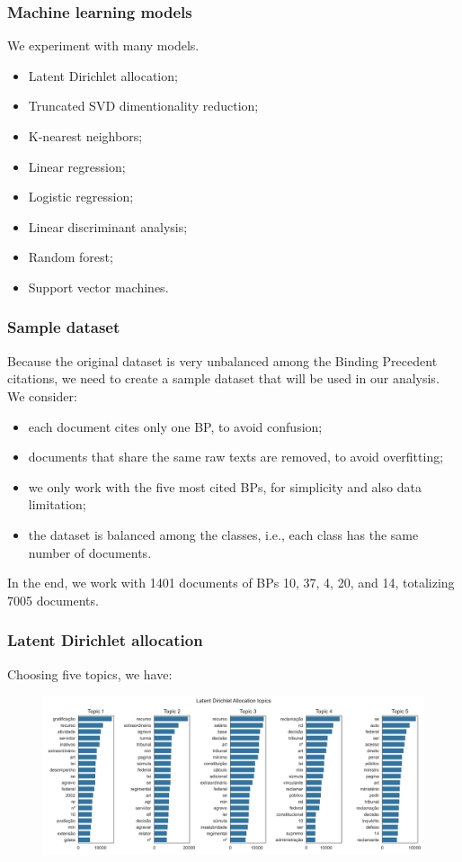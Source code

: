 \documentclass{beamer}
\begin{document}
    \begin{frame}
        \frametitle{Machine learning models}
        We experiment with many models.
        \begin{itemize}
            \item Latent Dirichlet allocation;
            \item Truncated SVD dimentionality reduction;
            \item K-nearest neighbors;
            \item Linear regression;
            \item Logistic regression;
            \item Linear discriminant analysis;
            \item Random forest;
            \item Support vector machines.
        \end{itemize}
    \end{frame}

    \begin{frame}
        \frametitle{Sample dataset}
        Because the original dataset is very unbalanced among the Binding Precedent citations, we need to create a sample dataset that will be used in our analysis. We consider:
        \begin{itemize}
            \item each document cites only one BP, to avoid confusion;
            \item documents that share the same raw texts are removed, to avoid overfitting;
            \item we only work with the five most cited BPs, for simplicity and also data limitation;
            \item the dataset is balanced among the classes, i.e., each class has the same number of documents.
        \end{itemize}
        In the end, we work with 1401 documents of BPs 10, 37, 4, 20, and 14, totalizing 7005 documents.
    \end{frame}

    \begin{frame}
        \frametitle{Latent Dirichlet allocation}
        Choosing five topics, we have:
        \begin{figure}
            \centering
            \includegraphics[width=\linewidth]{lda_topics.png}
        \end{figure}
    \end{frame}
\end{document}
